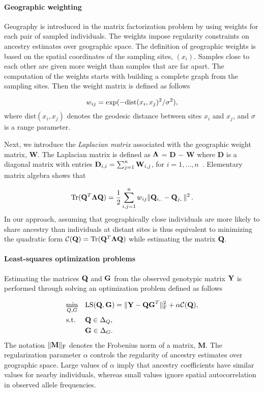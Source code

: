 \paragraph{Geographic weighting} Geography is introduced in the matrix
factorization problem by using weights for each pair of sampled individuals. The
weights impose regularity constraints on ancestry estimates over geographic
space. The definition of geographic weights is based on the spatial coordinates
of the sampling sites, $(x_i)$. Samples close to each other are given more
weight than samples that are far apart. The computation of the weights starts
with building a complete graph from the sampling sites. Then the weight matrix
is defined as follows

$$
w_{ij} = \exp( - {\rm dist}( x_i, x_j )^2/ \sigma^2),
$$
\noindent where dist$( x_i, x_j )$ denotes the geodesic distance between sites
$x_i$ and $x_j$, and $\sigma$ is a range parameter.


Next, we introduce the {\it Laplacian matrix} associated with the geographic
weight matrix, {\bf W}. The Laplacian matrix is defined as ${\bf \Lambda}$ =
{\bf D} $-$ {\bf W} where {\bf D} is a diagonal matrix with entries ${\bf
  D}_{i,i} = \sum_{j = 1}^n {\bf W}_{i,j}$, for $i = 1, \dots,
n$~\citep{Belkin2003}. Elementary matrix algebra shows that~\citep{DengCai2011}

$$
 {\rm Tr} ({\bf Q}^T {\bf \Lambda} {\bf Q})  = \frac12 \sum_{i,j = 1}^n  w_{ij}  \|   {\bf Q}_{i,.}  - {\bf Q}_{j,.} \|^2 \, .
$$
In our approach, assuming that geographically close individuals are more likely to share ancestry than individuals at distant sites is thus equivalent to minimizing the quadratic form ${\cal C}({\bf Q}) ={\rm Tr} ({\bf Q}^T {\bf \Lambda} {\bf Q})$ while estimating the matrix ${\bf Q}$. 

\paragraph{Least-squares optimization problems} Estimating the matrices ${\bf
  Q}$ and ${\bf G }$ from the observed genotypic matrix ${\bf Y}$ is performed
through solving an optimization problem defined as follows~\citep{Caye2016}

\begin{equation}
\begin{aligned}
& \underset{Q, G}{\text{min}}
& & {\rm LS}({\bf Q}, {\bf G}) =   \|  {\bf Y} - {\bf QG}^T \|^2_{\rm F} +  \alpha {\cal C}({\bf Q}) , \\
& \text{s.t.} & &  {\bf Q} \in \Delta_Q , \\
& & &  {\bf G} \in \Delta_G . \\
\end{aligned}
\label{eq:LS}
\end{equation}
\noindent The notation $\| {\bf M} \|_{\rm F}$ denotes the Frobenius norm of a
matrix, {\bf M}. The regularization parameter $\alpha $ controls the regularity
of ancestry estimates over geographic space. Large values of $\alpha $ imply
that ancestry coefficients have similar values for nearby individuals, whereas
small values ignore spatial autocorrelation in observed allele frequencies.


